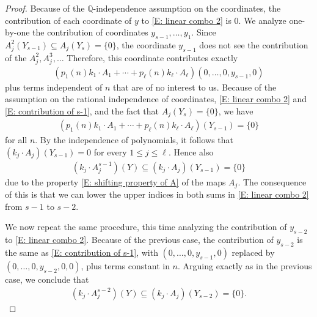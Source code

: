 \documentclass[10pt,a4paper]{amsart}
\newcommand{\Q}{{\mathbb Q}}
\begin{document}
\begin{proof}
    Because of the $\Q$-independence assumption on the coordinates, the contribution of each coordinate of $y$ to \eqref{E: linear combo 2} is 0. We analyze one-by-one the contribution of coordinates $y_{s-1}, \ldots, y_1$. Since $A_j^2(Y_{s-1})\subseteq A_j(Y_s) = \{0\}$, the coordinate $y_{s-1}$ does not see the contribution of the $A_j^2, A_j^3,\ldots$
    Therefore, this coordinate contributes exactly
    \begin{align}\label{E: contribution of s-1}
        (p_1(n) k_{1}\cdot A_{1} + \cdots + p_\ell(n) k_{\ell}\cdot A_{\ell})(0,\ldots, 0, y_{s-1}, 0)
    \end{align}
    plus terms independent of $n$ that are of no interest to us. Because of the assumption on the rational independence of coordinates, \eqref{E: linear combo 2} and \eqref{E: contribution of s-1}, and the fact that $A_{j}(Y_{s})=\{0\}$, we have
    \begin{align*}
        (p_1(n) k_{1}\cdot A_{1} + \cdots + p_\ell(n) k_{\ell}\cdot A_{\ell})({Y_{s-1}}) = \{0\}
    \end{align*}
     for all $n$. By the independence of polynomials, it follows that $(k_j\cdot A_j)({Y_{s-1}}) = 0$ for every $1\leq j\leq \ell$. Hence also
    \begin{align*}
        (k_j\cdot A_j^{s-1})(Y) \subseteq (k_j\cdot A_j)(Y_{s-1}) = \{0\}
    \end{align*}
    due to the property \eqref{E: shifting property of A} of the maps $A_j$.
    The consequence of this is that we can lower the upper indices in both sums in \eqref{E: linear combo 2} from $s-1$ to $s-2$. 

    We now repeat the same procedure, this time analyzing the contribution of $y_{s-2}$ to \eqref{E: linear combo 2}. Because of the previous case, the contribution of $y_{s-2}$ is the same as \eqref{E: contribution of s-1}, with $(0, \ldots, 0, y_{s-1},0)$ replaced by $(0,\ldots, 0, y_{s-2},0,0)$, plus terms constant in $n$. Arguing exactly as in the previous case, we conclude that
        \begin{align*}
        (k_j\cdot A_j^{s-2})(Y) \subseteq (k_j\cdot A_j)(Y_{s-2}) = \{0\}.
    \end{align*}
    

\end{proof}
\end{document}
